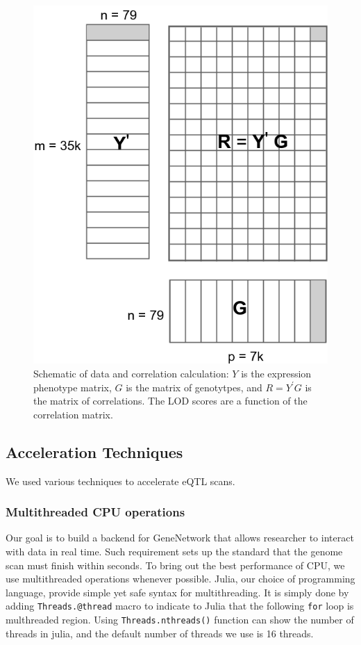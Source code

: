 \documentclass[9pt,twocolumn,twoside,lineno]{gsag3jnl}
\newcommand{\code}{\texttt}
\begin{document}
      \begin{figure}[!htb]
	
	\caption{Schematic of data and correlation calculation: $Y$ is
		the expression phenotype matrix, $G$ is the matrix of
		genotytpes, and $R=Y^{\prime}G$ is the matrix of
		correlations.  The LOD scores are a function of the
		correlation matrix.}
	\label{MatrixMult}
	\includegraphics[scale = .4]{figs/YGmatrix.png}
\end{figure}    

\subsection{Acceleration Techniques}
We used various techniques to accelerate eQTL scans. 
\subsubsection{Multithreaded CPU operations}
 Our goal is to build a backend for GeneNetwork that allows researcher to interact with data in real time. 
 Such requirement sets up the standard that the genome scan must finish within seconds.
 To bring out the best performance of CPU, we use multithreaded operations whenever possible. 
 Julia, our choice of programming language, provide simple yet safe syntax for multithreading. 
 It is simply done by adding \code{Threads.@thread} macro to indicate to Julia that the following \code{for} loop is multhreaded region. 
 Using \code{Threads.nthreads()} function can show the number of threads in julia, and the default number of threads we use is 16 threads. 
  
\end{document}
